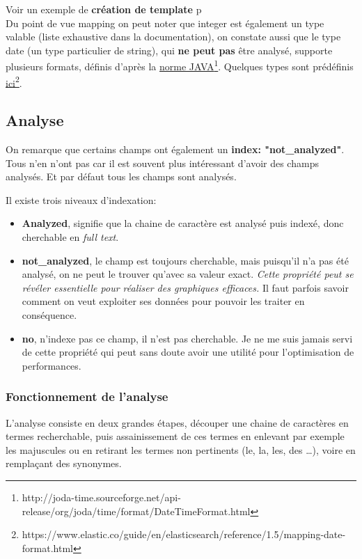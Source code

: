 {Voir un exemple de \textbf{création de template} p\pageref{lst:mappingput2}\\[2mm]

Du point de vue mapping on peut noter que integer est également un type valable (liste 
exhaustive dans la documentation), on constate aussi que le type date (un type particulier
de string), qui \textbf{ne peut pas} être analysé, supporte plusieurs formats, définis
d'après la \hyperref[http://joda-time.sourceforge.net/api-release/org/joda/time/format/DateTimeFormat.html]{norme JAVA}\footnote{http://joda-time.sourceforge.net/api-release/org/joda/time/format/DateTimeFormat.html}.
Quelques types sont prédéfinis \hyperref[https://www.elastic.co/guide/en/elasticsearch/reference/1.5/mapping-date-format.html]{ici}\footnote{https://www.elastic.co/guide/en/elasticsearch/reference/1.5/mapping-date-format.html}.


\subsection{Analyse}
On remarque que certains champs ont également un \textbf{index: "not\_analyzed"}.
Tous n'en n'ont pas car il est souvent plus intéressant d'avoir des champs analysés.
Et par défaut tous les champs sont analysés.

Il existe trois niveaux d'indexation:
\begin{itemize}
    \item   \textbf{Analyzed}, signifie que la chaine de caractère est analysé puis indexé,
    donc cherchable en \textit{full text}.
    \item   \textbf{not\_analyzed}, le champ est toujours cherchable, mais puisqu'il n'a pas 
    été analysé, on ne peut le trouver qu'avec sa valeur exact. \emph{Cette propriété
    peut se révéler essentielle pour réaliser des graphiques efficaces.} 
    \footnotesize{Il faut parfois savoir comment on veut exploiter ses données pour
    pouvoir les traiter en conséquence.}
    \item \textbf{no}, n'indexe pas ce champ, il n'est pas cherchable. Je ne me suis
    jamais servi de cette propriété qui peut sans doute avoir une utilité pour 
    l'optimisation de performances.
\end{itemize}

\subsubsection{Fonctionnement de l'analyse}
L'analyse consiste en deux grandes étapes, découper une chaine de caractères en termes
recherchable, puis assainissement de ces termes en enlevant par exemple les majuscules
ou en retirant les termes non pertinents (le, la, les, des \ldots), voire en 
remplaçant des synonymes.

}
